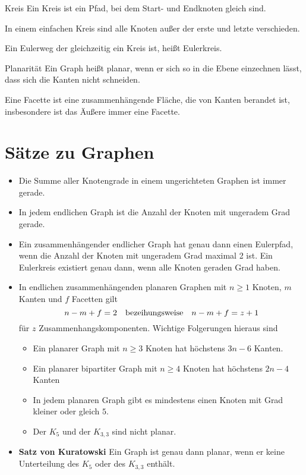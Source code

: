 \begin{definition}{Kreis}
	Ein Kreis ist ein Pfad, bei dem Start- und Endknoten gleich sind.

	In einem einfachen Kreis sind alle Knoten außer der erste und letzte verschieden.
\end{definition}
Ein Eulerweg der gleichzeitig ein Kreis ist, heißt Eulerkreis.

\begin{definition}{Planarität}
	Ein Graph heißt planar, wenn er sich so in die Ebene einzechnen lässt, dass sich die Kanten nicht schneiden.
\end{definition}

Eine Facette ist eine zusammenhängende Fläche, die von Kanten berandet ist, insbesondere ist das Äußere immer eine Facette.

\section{Sätze zu Graphen}
\begin{itemize}
	\item Die Summe aller Knotengrade in einem ungerichteten Graphen ist immer gerade.
	\item In jedem endlichen Graph ist die Anzahl der Knoten mit ungeradem Grad gerade.
	\item Ein zusammenhängender endlicher Graph hat genau dann einen Eulerpfad, wenn die Anzahl der Knoten mit ungeradem Grad maximal 2 ist. Ein Eulerkreis existiert genau dann, wenn alle Knoten geraden Grad haben.
	\item In endlichen zusammenhängenden planaren Graphen mit $n\geq 1$ Knoten, $m$ Kanten und $f$ Facetten gilt
	\begin{equation*}
		n-m+f=2\text{\quad bezeihungsweise\quad}n-m+f=z+1
	\end{equation*}
	für $z$ Zusammenhangskomponenten.
	Wichtige Folgerungen hieraus sind
	\begin{itemize}
		\item Ein planarer Graph mit $n\geq 3$ Knoten hat höchstens $3n-6$ Kanten.
		\item Ein planarer bipartiter Graph mit $n\geq 4$ Knoten hat höchstens $2n-4$ Kanten
		\item In jedem planaren Graph gibt es mindestens einen Knoten mit Grad kleiner oder gleich $5$.
		\item Der $K_5$ und der $K_{3,3}$ sind nicht planar.
	\end{itemize}

	\item \textbf{Satz von Kuratowski} Ein Graph ist genau dann planar, wenn er keine Unterteilung des $K_5$ oder des $K_{3,3}$ enthält.
\end{itemize}

